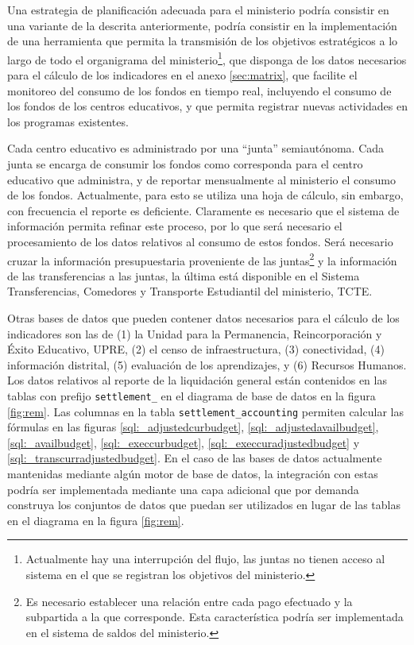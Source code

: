 \documentclass{article}
\begin{document}
\begin{multicols}{6}[]
Una estrategia de planificaci\'on adecuada para el ministerio podr\'ia consistir en una variante de la descrita anteriormente, podr\'ia consistir en la implementaci\'on de una herramienta que permita la transmisi\'on de los objetivos estrat\'egicos a lo largo de todo el organigrama del ministerio\footnote{Actualmente hay una interrupci\'on del flujo, las juntas no tienen acceso al sistema en el que se registran los objetivos del ministerio.}, que disponga de los datos necesarios para el c\'alculo de los indicadores en el anexo \ref{sec:matrix}, que facilite el monitoreo del consumo de los fondos en tiempo real, incluyendo el consumo de los fondos de los centros educativos, y que permita registrar nuevas actividades en los programas existentes.

Cada centro educativo es administrado por una ``junta'' semiaut\'onoma. Cada junta se encarga de consumir los fondos como corresponda para el centro educativo que administra, y de reportar mensualmente al ministerio el consumo de los fondos. Actualmente, para esto se utiliza una hoja de c\'alculo, sin embargo, con frecuencia el reporte es deficiente. Claramente es necesario que el sistema de informaci\'on permita refinar este proceso, por lo que ser\'a necesario el procesamiento de los datos relativos al consumo de estos fondos. Ser\'a necesario cruzar la informaci\'on presupuestaria proveniente de las juntas\footnote{Es necesario establecer una relaci\'on entre cada pago efectuado y la subpartida a la que corresponde. Esta caracter\'istica podr\'ia ser implementada en el sistema de saldos del ministerio.} y la informaci\'on de las transferencias a las juntas, la \'ultima est\'a disponible en el Sistema Transferencias, Comedores y Transporte Estudiantil del ministerio, TCTE.

Otras bases de datos que pueden contener datos necesarios para el c\'alculo de los indicadores son las de (1) la Unidad para la Permanencia, Reincorporaci\'on y \'Exito Educativo, UPRE, (2) el censo de infraestructura, (3) conectividad, (4) informaci\'on distrital, (5) evaluaci\'on de los aprendizajes, y (6) Recursos Humanos. Los datos relativos al reporte de la liquidaci\'on general est\'an contenidos en las tablas con prefijo \verb#settlement_# en el diagrama de base de datos en la figura \ref{fig:rem}. Las columnas en la tabla \verb#settlement_accounting# permiten calcular las f\'ormulas en las figuras \ref{sql:_adjustedcurbudget}, \ref{sql:_adjustedavailbudget}, \ref{sql:_availbudget}, \ref{sql:_execcurbudget}, \ref{sql:_execcuradjustedbudget} y \ref{sql:_transcurradjustedbudget}. En el caso de las bases de datos actualmente mantenidas mediante alg\'un motor de base de datos, la integraci\'on con estas podr\'ia ser implementada mediante una capa adicional que por demanda construya los conjuntos de datos que puedan ser utilizados en lugar de las tablas en el diagrama en la figura \ref{fig:rem}.


\end{multicols}
\end{document}
